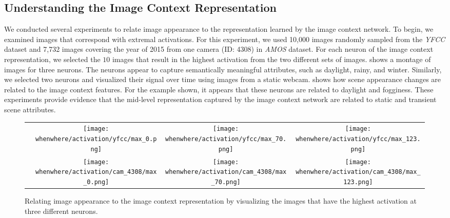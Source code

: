 \subsection{Understanding the Image Context Representation}

We conducted several experiments to relate image appearance to the
representation learned by the image context network.
%
To begin, we examined images that correspond with extremal
activations.  For this experiment, we used 10,000 images randomly
sampled from the {\em YFCC} dataset and 7,732 images covering the year of 2015 from 
one camera (ID: 4308) in {\em AMOS} dataset. For each neuron of 
the image context representation, we selected the $10$ images that result in 
the highest activation from the two different sets of images.   
shows a montage of images for three neurons.  The neurons appear to capture
semantically meaningful attributes, such as daylight, rainy, and winter. 
%
Similarly, we selected two neurons and visualized their signal over
time using images from a static webcam.  shows how
scene appearance changes are related to the image context features.
For the example shown, it appears that these neurons are related to
daylight and fogginess. 
%
These experiments provide evidence that the mid-level representation
captured by the image context network are related to static and
transient scene attributes.

\begin{figure*}[t] 
  \centering
  
  \setlength\tabcolsep{2pt}
  \renewcommand{\arraystretch}{0}
  \begin{tabular}{lccc}
    \vspace {0.1cm}
    \raisebox{.3\height}{\rotatebox{90}{\em YFCC}} &
    \texttt{[image: whenwhere/activation/yfcc/max\_0.png]} &
    \texttt{[image: whenwhere/activation/yfcc/max\_70.png]}&
    \texttt{[image: whenwhere/activation/yfcc/max\_123.png]}\\
    \raisebox{-.05\height}{\rotatebox{90}{{\em AMOS:4308}}} &
    \texttt{[image: whenwhere/activation/cam\_4308/max\_0.png]} &
    \texttt{[image: whenwhere/activation/cam\_4308/max\_70.png]} &
    \texttt{[image: whenwhere/activation/cam\_4308/max\_123.png]}
    
  \end{tabular}
  
  \caption {Relating image appearance to the image context
    representation by visualizing the images that have the highest
    activation at three different neurons.}

  \label{fig:activation}
\end{figure*}

